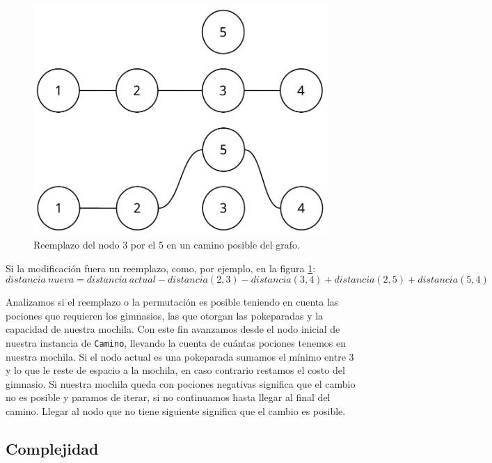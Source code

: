 \begin{figure}[H]
  \begin{center}
    \includegraphics[scale = 0.5]{imagenes/ej3_algoritmo_2.pdf}
    \caption{Reemplazo del nodo 3 por el 5 en un camino posible del grafo.}
    \label{fig:ej3_algoritmo_2}
  \end{center}
\end{figure}

Si la modificaci\'on fuera un reemplazo, como, por ejemplo, en la figura \ref{fig:ej3_algoritmo_2}:
\begin{equation*}
distancia\ nueva = distancia\ actual - distancia(2,3) - distancia(3,4) + distancia(2,5) + distancia(5,4)
\end{equation*}

Analizamos si el reemplazo o la permutaci\'on es posible teniendo en cuenta las pociones que requieren los gimnasios, las que otorgan las pokeparadas y la capacidad de nuestra mochila. Con este fin avanzamos desde el nodo inicial de nuestra instancia de \texttt{Camino}, llevando la cuenta de cu\'antas pociones tenemos en nuestra mochila. Si el nodo actual es una pokeparada sumamos el m\'inimo entre 3 y lo que le reste de espacio a la mochila, en caso contrario restamos el costo del gimnasio. Si nuestra mochila queda con pociones negativas significa que el cambio no es posible y paramos de iterar, si no continuamos hasta llegar al final del camino. Llegar al nodo que no tiene siguiente significa que el cambio es posible.

\subsection{Complejidad}

